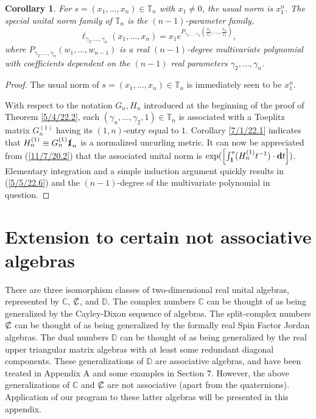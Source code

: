 \documentclass{amsart}
\newtheorem{corollary}[theorem]{Corollary}
\theoremstyle{definition}
\numberwithin{theorem}{section}
\numberwithin{equation}{section}
\begin{document}
\begin{corollary}\label{5/17/22.1} For $s= (x_1,\dots,x_n)\in \mathbb{T}_n$ with $x_1\ne 0$, the usual norm is $x_1^n$.  The special unital norm family of $\mathbb{T}_n$ is the $(n-1)$-parameter family,
\begin{equation} \label{5/5/22.6} \ell_{\gamma_2,\dots,\gamma_n}(x_1,\dots,x_n) = x_1 e^{P_{\gamma_2,\dots,\gamma_n}\left(\frac{x_2}{x_1},\dots,\frac{x_n}{x_1}\right)},\end{equation} where $P_{\gamma_2,\dots,\gamma_n}(w_1,\dots,w_{n-1})$ is a real $(n-1)$-degree multivariate polynomial with coefficients dependent on the $(n-1)$ real parameters $\gamma_2,\dots,\gamma_n$.    \end{corollary}

\begin{proof} The usual norm of $s=(x_1,\dots,x_n)\in \mathbb{T}_n$ is immediately seen to be $x_1^n$.

With respect to the notation $G_n,H_n$ introduced at the beginning of the proof of Theorem \ref{5/4/22.2}, each $(\gamma_n,\dots,\gamma_2,1)\in\mathbb{T}_n$ is associated with a Toeplitz matrix $G_n^{(1)}$ having its $(1,n)$-entry equal to $1$.  Corollary \ref{7/1/22.1} indicates that $H^{(1)}_n\equiv G_n^{(1)}\slashed{\bf 1}_n$ is a normalized uncurling metric. It can now be appreciated from (\ref{11/7/20.2}) that  the associated unital norm is $\text{exp}(\left[\int_{\bf 1}^s (H_n^{(1)} t^{-1})\cdot \mathbf{d}t\right])$.  Elementary integration and a simple induction argument quickly results in (\ref{5/5/22.6}) and the $(n-1)$-degree of the multivariate polynomial in question.
\end{proof}

\vspace{.75cm}

  \section{Extension to certain not associative algebras}
There are three isomorphism classes of two-dimensional real unital algebras, represented by $\mathbb{C}$, $\slashed{\mathbb{C}}$, and $\mathbb{D}$.  The complex numbers $\mathbb{C}$ can be thought of as being generalized by the Cayley-Dixon sequence of algebras.  The split-complex numbers $\slashed{\mathbb{C}}$ can be thought of as being generalized by the formally real Spin Factor Jordan algebras.  The dual numbers $\mathbb{D}$ can be thought of as being generalized by the real upper triangular matrix algebras with at least some redundant diagonal components.  These generalizations of $\mathbb{D}$ are associative algebras, and have been treated in Appendix A and some examples in Section 7.  However, the above generalizations of $\mathbb{C}$ and $\slashed{\mathbb{C}}$ are not associative (apart from the quaternions).  Application of our program to these latter algebras will be presented in this appendix. 
\end{document}

